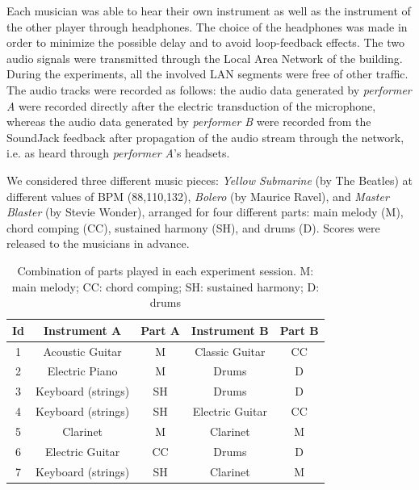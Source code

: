 Each musician was able to hear their own instrument as well as the instrument of the other player through headphones. The choice of the headphones was made in order to minimize the possible delay and to avoid loop-feedback effects. The two audio signals were transmitted through the Local Area Network of the building. During the experiments, all the involved LAN segments were free of other traffic. The audio tracks were recorded as follows: the audio data generated by \textit{performer A} were recorded directly after the electric transduction of the microphone, whereas the audio data generated by \textit{performer B} were recorded from the SoundJack feedback after propagation of the audio stream through the network, i.e. as heard through \textit{performer A}'s headsets.

We considered three different music pieces: \textit{Yellow Submarine} (by The Beatles) at different values of BPM (88,110,132), \textit{Bolero} (by Maurice Ravel), and \textit{Master Blaster} (by Stevie Wonder), arranged for four different parts: main melody (M), chord comping (CC), sustained harmony (SH), and drums (D).  Scores were released to the musicians in advance.

\begin{table}[tb]
  \caption{Combination of parts played in each experiment session. M: main melody; CC: chord comping; SH: sustained harmony; D: drums}
  \centering %
  \label{tab:NMP:sessions}
  \bgroup
  \def\arraystretch{1.5}
 \begin{tabular}{||c|c|c|c|c||}
 \hline
 \hline
  Id & Instrument A& Part A & Instrument B & Part B \\
 \hline
 \hline
  1 & Acoustic Guitar & M & Classic Guitar & CC\\
  2 & Electric Piano & M & Drums & D\\
  3 & Keyboard (strings)  & SH & Drums & D\\
  4 & Keyboard (strings)  & SH & Electric Guitar & CC\\
  5 & Clarinet & M & Clarinet & M\\
  6 & Electric Guitar  & CC & Drums & D\\
  7 & Keyboard (strings)  & SH & Clarinet & M\\
 \hline
 \hline
   \end{tabular}
   \egroup
\end{table}

